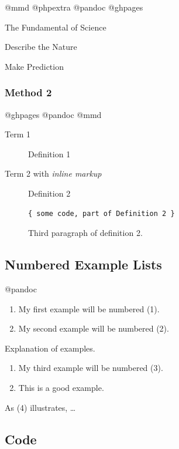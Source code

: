 \documentclass[]{article}
\providecommand{\tightlist}{%
  \setlength{\itemsep}{0pt}\setlength{\parskip}{0pt}}
\begin{document}
@mmd @phpextra @pandoc @ghpages

\begin{description}
\tightlist
\item[Physics]
The Fundamental of Science

Describe the Nature

Make Prediction
\end{description}

\subsubsection{Method 2}\label{method-2}

@ghpages @pandoc @mmd

\begin{description}
\item[Term 1]
Definition 1
\item[Term 2 with \emph{inline markup}]
Definition 2

\begin{verbatim}
{ some code, part of Definition 2 }
\end{verbatim}

Third paragraph of definition 2.
\end{description}

\subsection{Numbered Example Lists}\label{numbered-example-lists}

@pandoc

\begin{enumerate}
\def\labelenumi{(\arabic{enumi})}
\tightlist
\item
  My first example will be numbered (1).
\item
  My second example will be numbered (2).
\end{enumerate}

Explanation of examples.

\begin{enumerate}
\def\labelenumi{(\arabic{enumi})}
\setcounter{enumi}{2}
\item
  My third example will be numbered (3).
\item
  This is a good example.
\end{enumerate}

As (4) illustrates, \ldots{}

\subsection{Code}\label{code}
\end{document}
